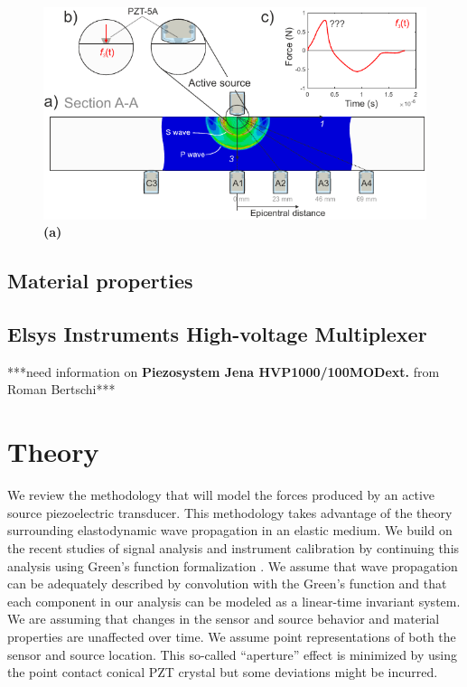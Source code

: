 \documentclass[preprint,3p, 11pt,authoryear]{elsarticle}
\begin{document}
\begin{figure}[ht]
     	\centering
\includegraphics[scale= 1.0]{FIG2.pdf} 
\caption{\textbf{(a)}  }
	\label{fig2} 
\end{figure}

\subsection{Material properties}


\subsection{Elsys Instruments High-voltage Multiplexer}
***need information on \textbf{Piezosystem Jena HVP1000/100MODext.} from Roman Bertschi***



\section{Theory}
\label{theo}
We review the methodology that will model the forces produced by an active source piezoelectric transducer.  This methodology takes advantage of the theory surrounding elastodynamic wave propagation in an elastic medium.  We build on the recent studies of signal analysis and instrument calibration by \citet{McLaksey2012} continuing this analysis using Green's function formalization \citep{Aki2002, Johnson1974}. We assume that wave propagation can be adequately described by convolution with the Green's function and that each component in our analysis can be modeled as a linear-time invariant system.  We are assuming that changes in the sensor and source behavior and material properties are unaffected over time.  We assume point representations of both the sensor and source location. This so-called ``aperture'' effect is minimized by using the point contact conical PZT crystal but some deviations might be incurred.
\end{document}
